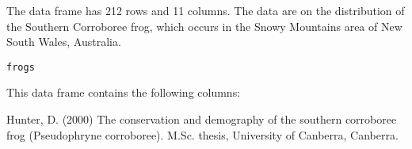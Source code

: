 \begin{Description}\relax
The  data frame has 212 rows and 11 columns.
The data are on the distribution of the Southern Corroboree
frog, which occurs in the Snowy Mountains area of New South Wales,
Australia.
\end{Description}
\begin{Usage}
\begin{verbatim}frogs\end{verbatim}
\end{Usage}
\begin{Format}\relax
This data frame contains the following columns:
\end{Format}
\begin{Source}\relax
Hunter, D. (2000) The conservation and demography of 
the southern corroboree frog (Pseudophryne corroboree). M.Sc. thesis,
University of Canberra, Canberra.
\end{Source}
